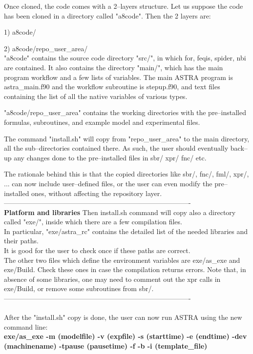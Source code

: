\documentclass[12pt]{article}
\begin{document}
Once cloned, the code comes with a 2--layers structure.
Let us suppose the code has been cloned in a directory called "a8code".
Then the 2 layers are:

1) a8code/

2) a8code/repo\_user\_area/ \\
"a8code" contains the source code directory "src/", in which for, feqis, spider, nbi are contained. It also contains the directory "main/", which has the main program workflow and a few lists of variables. The main ASTRA program is astra\_main.f90 and the workflow subroutine is stepup.f90, and text files containing the list of all the native variables of various types. 

"a8code/repo\_user\_area" contains the working directories with the pre--installed formulas, subroutines, and example model and experimental files.

The command "install.sh" will copy from "repo\_user\_area" to the main directory, all the sub--directories contained there. As such, the user should eventually back--up any changes done to the pre--installed files in sbr/ xpr/ fnc/ etc.

The rationale behind this is that the copied directories like sbr/, fnc/, fml/, xpr/, ... can now include user--defined files, or the user can even modify the pre--installed ones, without affecting the repository layer.\\%
----------------------------------------------------------------------------------\\
{\bf Platform and libraries}
Then install.sh command will copy also a directory called "exe/", inside which there are a few compilation files. \\
In particular, "exe/astra\_rc" contains the detailed list of the needed libraries and their paths. \\
It is good for the user to check once if these paths are correct. \\
The other two files which define the environment variables are exe/as\_exe and exe/Build. Check these ones in case the compilation returns errors. Note that, in absence of some libraries, one may need to comment out the xpr calls in exe/Build, or remove some subroutines from sbr/.\\
----------------------------------------------------------------------------------\\\\
After the "install.sh" copy is done, the user can now run ASTRA using the new command line: \\
{\bf exe/as\_exe -m (modelfile) -v (expfile) -s (starttime) -e (endtime) -dev (machinename) -tpause (pausetime) -f -b -i (template\_file)}
\end{document}
